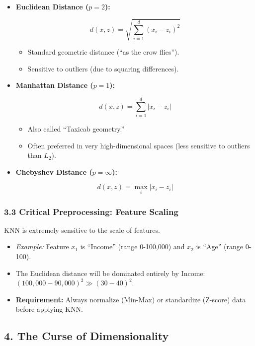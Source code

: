 \documentclass[
  italian,
  11pt,
]{article}
\begin{document}
\begin{itemize}
\item
  \textbf{Euclidean Distance (\(p=2\)):}

  \[d(x, z) = \sqrt{\sum_{i=1}^d (x_i - z_i)^2}\]

  \begin{itemize}
  \item
    Standard geometric distance (``as the crow flies'').
  \item
    Sensitive to outliers (due to squaring differences).
  \end{itemize}
\item
  \textbf{Manhattan Distance (\(p=1\)):}

  \[d(x, z) = \sum_{i=1}^d |x_i - z_i|\]

  \begin{itemize}
  \item
    Also called ``Taxicab geometry.''
  \item
    Often preferred in very high-dimensional spaces (less sensitive to
    outliers than \(L_2\)).
  \end{itemize}
\item
  \textbf{Chebyshev Distance (\(p=\infty\)):}

  \[d(x, z) = \max_i |x_i - z_i|\]
\end{itemize}

\subsubsection{3.3 Critical Preprocessing: Feature
Scaling}\label{critical-preprocessing-feature-scaling}

KNN is extremely sensitive to the scale of features.

\begin{itemize}
\item
  \emph{Example:} Feature \(x_1\) is ``Income'' (range 0-100,000) and
  \(x_2\) is ``Age'' (range 0-100).
\item
  The Euclidean distance will be dominated entirely by Income:
  \((100,000 - 90,000)^2 \gg (30 - 40)^2\).
\item
  \textbf{Requirement:} Always normalize (Min-Max) or standardize
  (Z-score) data before applying KNN.
\end{itemize}

\subsection{4. The Curse of
Dimensionality}\label{the-curse-of-dimensionality}
\end{document}
